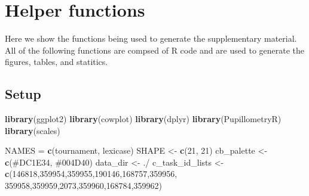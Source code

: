 \documentclass[
]{book}
\newenvironment{Shaded}{\begin{snugshade}}{\end{snugshade}}
\newcommand{\DecValTok}[1]{\textcolor[rgb]{0.00,0.00,0.81}{#1}}
\newcommand{\FunctionTok}[1]{\textcolor[rgb]{0.13,0.29,0.53}{\textbf{#1}}}
\newcommand{\NormalTok}[1]{#1}
\newcommand{\OtherTok}[1]{\textcolor[rgb]{0.56,0.35,0.01}{#1}}
\newcommand{\StringTok}[1]{\textcolor[rgb]{0.31,0.60,0.02}{#1}}
\begin{document}
\hypertarget{helper-functions}{%
\chapter{Helper functions}\label{helper-functions}}

Here we show the functions being used to generate the supplementary material.
All of the following functions are compsed of R code and are used to generate the figures, tables, and statitics.

\hypertarget{setup}{%
\section{Setup}\label{setup}}

\begin{Shaded}
\begin{Highlighting}[]
\FunctionTok{library}\NormalTok{(ggplot2)}
\FunctionTok{library}\NormalTok{(cowplot)}
\FunctionTok{library}\NormalTok{(dplyr)}
\FunctionTok{library}\NormalTok{(PupillometryR)}
\FunctionTok{library}\NormalTok{(scales)}

\NormalTok{NAMES }\OtherTok{=} \FunctionTok{c}\NormalTok{(}\StringTok{\textquotesingle{}tournament\textquotesingle{}}\NormalTok{, }\StringTok{\textquotesingle{}lexicase\textquotesingle{}}\NormalTok{)}
\NormalTok{SHAPE }\OtherTok{\textless{}{-}} \FunctionTok{c}\NormalTok{(}\DecValTok{21}\NormalTok{, }\DecValTok{21}\NormalTok{)}
\NormalTok{cb\_palette }\OtherTok{\textless{}{-}} \FunctionTok{c}\NormalTok{(}\StringTok{\textquotesingle{}\#DC1E34\textquotesingle{}}\NormalTok{, }\StringTok{\textquotesingle{}\#004D40\textquotesingle{}}\NormalTok{)}
\NormalTok{data\_dir }\OtherTok{\textless{}{-}} \StringTok{\textquotesingle{}./\textquotesingle{}}
\NormalTok{c\_task\_id\_lists }\OtherTok{\textless{}{-}} \FunctionTok{c}\NormalTok{(}\DecValTok{146818}\NormalTok{,}\DecValTok{359954}\NormalTok{,}\DecValTok{359955}\NormalTok{,}\DecValTok{190146}\NormalTok{,}\DecValTok{168757}\NormalTok{,}\DecValTok{359956}\NormalTok{,}
                        \DecValTok{359958}\NormalTok{,}\DecValTok{359959}\NormalTok{,}\DecValTok{2073}\NormalTok{,}\DecValTok{359960}\NormalTok{,}\DecValTok{168784}\NormalTok{,}\DecValTok{359962}\NormalTok{)}


\end{Highlighting}
\end{Shaded}
\end{document}
